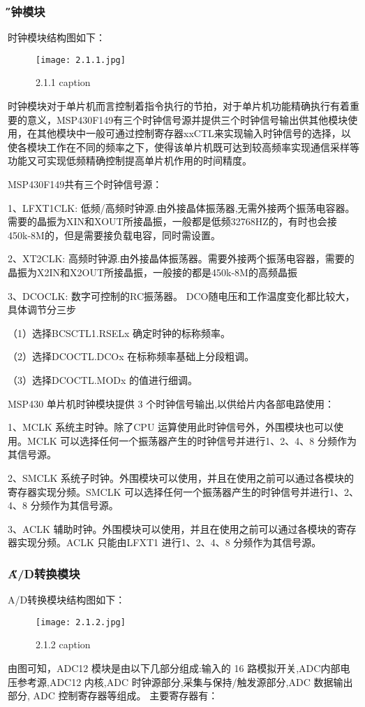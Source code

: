\documentclass[12pt]{article} %
\begin{document}
	 	\subsubsection{\H 时钟模块} 
	 	时钟模块结构图如下：
	 	\begin{figure}[H] %
 		  \centering
 		  \texttt{[image: 2.1.1.jpg]} 
  		  \caption{2.1.1 caption}
  		 \label{fig:2.1.1}
		\end{figure}
		时钟模块对于单片机而言控制着指令执行的节拍，对于单片机功能精确执行有着重要的意义，MSP430F149有三个时钟信号源并提供三个时钟信号输出供其他模块使用，在其他模块中一般可通过控制寄存器xxCTL来实现输入时钟信号的选择，以使各模块工作在不同的频率之下，使得该单片机既可达到较高频率实现通信采样等功能又可实现低频精确控制提高单片机作用的时间精度。
		\par MSP430F149共有三个时钟信号源：
		\par 1、LFXT1CLK: 低频/高频时钟源.由外接晶体振荡器,无需外接两个振荡电容器。需要的晶振为XIN和XOUT所接晶振，一般都是低频32768HZ的，有时也会接450k-8M的，但是需要接负载电容，同时需设置。
		\par 2、XT2CLK: 高频时钟源.由外接晶体振荡器。需要外接两个振荡电容器，需要的晶振为X2IN和X2OUT所接晶振，一般接的都是450k-8M的高频晶振
		\par 3、DCOCLK: 数字可控制的RC振荡器。 DCO随电压和工作温度变化都比较大，具体调节分三步
		\par（1）选择BCSCTL1.RSELx 确定时钟的标称频率。
		\par（2）选择DCOCTL.DCOx 在标称频率基础上分段粗调。
		\par（3）选择DCOCTL.MODx 的值进行细调。
		
		\par MSP430 单片机时钟模块提供 3 个时钟信号输出,以供给片内各部电路使用：
		\par 1、MCLK 系统主时钟。除了CPU 运算使用此时钟信号外，外围模块也可以使用。MCLK 可以选择任何一个振荡器产生的时钟信号并进行1、2、4、8 分频作为其信号源。
		\par 2、SMCLK 系统子时钟。外围模块可以使用，并且在使用之前可以通过各模块的寄存器实现分频。SMCLK 可以选择任何一个振荡器产生的时钟信号并进行1、2、4、8 分频作为其信号源。
		\par 3、ACLK 辅助时钟。外围模块可以使用，并且在使用之前可以通过各模块的寄存器实现分频。ACLK 只能由LFXT1 进行1、2、4、8 分频作为其信号源。
	 	
	 	\subsubsection{\H A/D转换模块} 
	 	A/D转换模块结构图如下：
	 	\begin{figure}[H] %
 		  \centering
 		  \texttt{[image: 2.1.2.jpg]} 
  		  \caption{2.1.2 caption}
  		 \label{fig:2.1.2}
		\end{figure}
		由图可知，ADC12 模块是由以下几部分组成:输入的 16 路模拟开关,ADC内部电压参考源,ADC12 内核,ADC 时钟源部分,采集与保持/触发源部分,ADC 数据输出部分, ADC 控制寄存器等组成。
		主要寄存器有：
		
\end{document}
